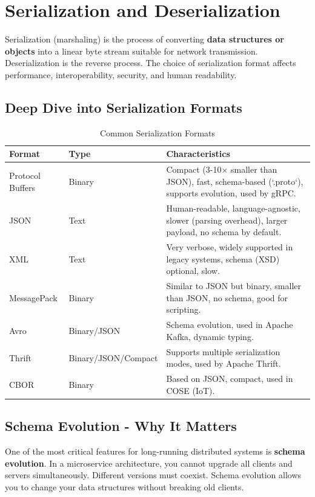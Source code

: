 \documentclass[10pt,a4paper]{article}
\begin{document}
\section{Serialization and Deserialization}
Serialization (marshaling) is the process of converting \textbf{data structures or objects} into a linear byte stream suitable for network transmission. Deserialization is the reverse process. The choice of serialization format affects performance, interoperability, security, and human readability.

\subsection{Deep Dive into Serialization Formats}

\begin{table}[H]
\centering
\begin{tabular}{p{3.5cm}p{2.5cm}p{7cm}}
\toprule
\textbf{Format} & \textbf{Type} & \textbf{Characteristics} \\
\midrule
Protocol Buffers & Binary & Compact (3-10× smaller than JSON), fast, schema-based (`.proto`), supports evolution, used by gRPC. \\
JSON & Text & Human-readable, language-agnostic, slower (parsing overhead), larger payload, no schema by default. \\
XML & Text & Very verbose, widely supported in legacy systems, schema (XSD) optional, slow. \\
MessagePack & Binary & Similar to JSON but binary, smaller than JSON, no schema, good for scripting. \\
Avro & Binary/JSON & Schema evolution, used in Apache Kafka, dynamic typing. \\
Thrift & Binary/JSON/Compact & Supports multiple serialization modes, used by Apache Thrift. \\
CBOR & Binary & Based on JSON, compact, used in COSE (IoT). \\
\bottomrule
\end{tabular}
\caption{Common Serialization Formats}
\end{table}

\subsection{Schema Evolution - Why It Matters}
One of the most critical features for long-running distributed systems is \textbf{schema evolution}. In a microservice architecture, you cannot upgrade all clients and servers simultaneously. Different versions must coexist. Schema evolution allows you to change your data structures without breaking old clients.
\end{document}
